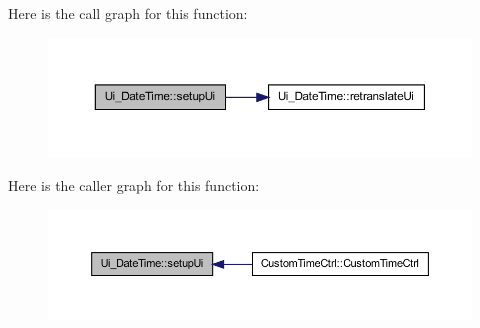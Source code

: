 Here is the call graph for this function:\nopagebreak
\begin{figure}[H]
\begin{center}
\leavevmode
\includegraphics[width=362pt]{class_ui___date_time_aec460e980f671b301914cde3e3802143_cgraph}
\end{center}
\end{figure}




Here is the caller graph for this function:\nopagebreak
\begin{figure}[H]
\begin{center}
\leavevmode
\includegraphics[width=390pt]{class_ui___date_time_aec460e980f671b301914cde3e3802143_icgraph}
\end{center}
\end{figure}




